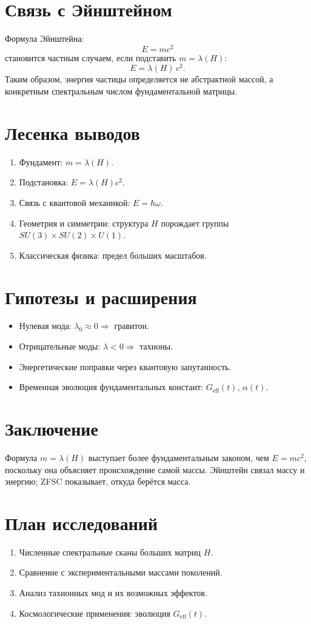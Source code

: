 \documentclass[12pt,a4paper]{article}
\begin{document}
\section*{Связь с Эйнштейном}
Формула Эйнштейна:
\[
E = mc^2
\]
становится частным случаем, если подставить $m = \lambda(H)$:
\[
E = \lambda(H) \, c^2.
\]
Таким образом, энергия частицы определяется не абстрактной массой, 
а конкретным спектральным числом фундаментальной матрицы.

\section*{Лесенка выводов}
\begin{enumerate}
  \item Фундамент: $m = \lambda(H)$.
  \item Подстановка: $E = \lambda(H)c^2$.
  \item Связь с квантовой механикой: $E = \hbar \omega$.
  \item Геометрия и симметрии: структура $H$ порождает группы $SU(3)\times SU(2)\times U(1)$.
  \item Классическая физика: предел больших масштабов.
\end{enumerate}

\section*{Гипотезы и расширения}
\begin{itemize}
  \item Нулевая мода: $\lambda_0 \approx 0 \Rightarrow$ гравитон.
  \item Отрицательные моды: $\lambda<0 \Rightarrow$ тахионы.
  \item Энергетические поправки через квантовую запутанность.
  \item Временная эволюция фундаментальных констант: $G_\mathrm{eff}(t)$, $\alpha(t)$.
\end{itemize}

\section*{Заключение}
Формула $m=\lambda(H)$ выступает более фундаментальным законом, 
чем $E=mc^2$, поскольку она объясняет происхождение самой массы. 
Эйнштейн связал массу и энергию; ZFSC показывает, откуда берётся масса.

\section*{План исследований}
\begin{enumerate}
  \item Численные спектральные сканы больших матриц $H$.
  \item Сравнение с экспериментальными массами поколений.
  \item Анализ тахионных мод и их возможных эффектов.
  \item Космологические применения: эволюция $G_\mathrm{eff}(t)$.
\end{enumerate}
\end{document}

